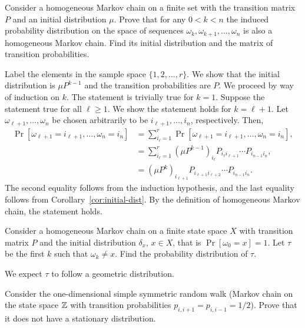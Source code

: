 \begin{problem}{2}
    Consider a homogeneous Markov chain on a finite set with the transition matrix $P$ and an initial distribution $\mu$. Prove that for any $0 < k < n$ the induced probability distribution on the space of sequences $\omega_k,\omega_{k+1},\ldots, \omega_n$ is also a homogeneous Markov chain. Find its initial distribution and the matrix of transition probabilities.
\end{problem}
\begin{solution}
    Label the elements in the sample space $\{1,2,\ldots,r\}$. We show that the initial distribution is $\mu P^{k-1}$ and the transition probabilities are $P$. We proceed by way of induction on $k$. The statement is trivially true for $k=1$. Suppose the statement true for all $\ell \geq 1$. We show the statement holds for $k=\ell+1$. Let $\omega_{\ell+1},\ldots,\omega_n$ be chosen arbitrarily to be $i_{\ell+1},\ldots,i_n$, respectively. Then, 
    \begin{align*}
        \Pr[\omega_{\ell+1}=i_{\ell+1},\ldots,\omega_n=i_n] &= \sum_{i_\ell = 1}^r \Pr[\omega_{\ell+1}=i_{\ell+1},\ldots,\omega_n=i_n], \\
        &= \sum_{i_\ell=1}^r \left(\mu P^{k-1}\right)_{i_\ell} P_{i_\ell i_{\ell+1}}\cdots P_{i_{n-1}i_n}, \\
        &= \left(\mu P^k\right)_{i_{\ell + 1}} P_{i_{\ell + 1}i_{\ell+2}}\cdots P_{i_{n-1}i_n}.  
    \end{align*}
    The second equality follows from the induction hypothesis, and the last equality follows from Corollary~\ref{cor:initial-dist}. By the definition of homogeneous Markov chain, the statement holds.
\end{solution}

\begin{problem}{3}
    Consider a homogeneous Markov chain on a finite state space $X$ with transition matrix $P$ and the initial distribution $\delta_x$, $x \in X$, that is $\Pr[\omega_0 = x] = 1$. Let $\tau$ be the first $k$ such that $\omega_k \neq x$. Find the probability distribution of $\tau$. 
\end{problem}
\begin{solution}
    We expect $\tau$ to follow a geometric distribution.
\end{solution}

\begin{problem}{4}
    Consider the one-dimensional simple symmetric random walk (Markov chain on the state space $\mathbb{Z}$ with transition probabilities $p_{i,i+1} = p_{i,i-1} = 1/2$). Prove that it does not have a stationary distribution.
\end{problem}
\begin{solution}
    
\end{solution}